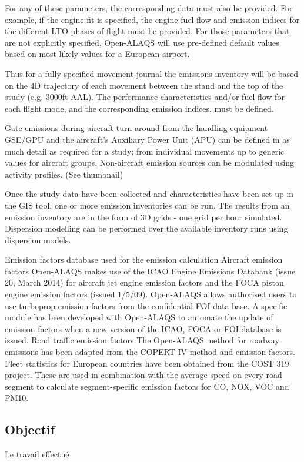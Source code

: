 \documentclass[a4paper]{article}
\begin{document}
    For any of these parameters, the corresponding data must also be provided. For example, if the engine fit is specified, the engine fuel flow and emission indices for the different LTO phases of flight must be provided. For those parameters that are not explicitly specified, Open-ALAQS will use pre-defined default values based on most likely values for a European airport.
    
    Thus for a fully specified movement journal the emissions inventory will be based on the 4D trajectory of each movement between the stand and the top of the study (e.g. 3000ft AAL). The performance characteristics and/or fuel flow for each flight mode, and the corresponding emission indices, must be defined.
    
    Gate emissions during aircraft turn-around from the handling equipment GSE/GPU and the aircraft’s Auxiliary Power Unit (APU) can be defined in as much detail as required for a study; from individual movements up to generic values for aircraft groups. Non-aircraft emission sources can be modulated using activity profiles. (See thumbnail)
    
    Once the study data have been collected and characteristics have been set up in the GIS tool, one or more emission inventories can be run. The results from an emission inventory are in the form of 3D grids - one grid per hour simulated. Dispersion modelling can be performed over the available inventory runs using dispersion models.
    
    Emission factors database used for the emission calculation
    Aircraft emission factors	Open-ALAQS makes use of the ICAO Engine Emissions Databank (issue 20, March 2014) for aircraft jet engine emission factors and the FOCA piston engine emission factors (issued 1/5/09). Open-ALAQS allows authorised users to use turboprop emission factors from the confidential FOI data base. A specific module has been developed with Open-ALAQS to automate the update of emission factors when a new version of the ICAO, FOCA or FOI database is issued.
    Road traffic emission factors	
    The Open-ALAQS method for roadway emissions has been adapted from the COPERT IV method and emission factors. Fleet statistics for European countries have been obtained from the COST 319 project. These are used in combination with the average speed on every road segment to calculate segment-specific emission factors for CO, NOX, VOC and PM10.
    \subsection{Objectif}
    Le travail effectué 
    
\end{document}
